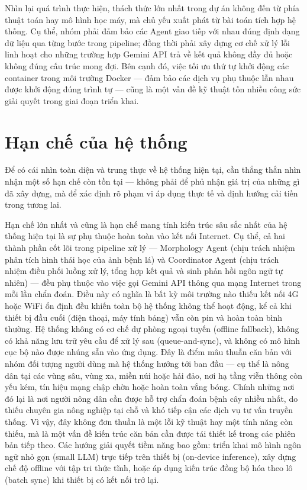 Nhìn lại quá trình thực hiện, thách thức lớn nhất trong dự án không đến từ phía thuật toán hay mô hình học máy, mà chủ yếu xuất phát từ bài toán tích hợp hệ thống. Cụ thể, nhóm phải đảm bảo các Agent giao tiếp với nhau đúng định dạng dữ liệu qua từng bước trong pipeline; đồng thời phải xây dựng cơ chế xử lý lỗi linh hoạt cho những trường hợp Gemini API trả về kết quả không đầy đủ hoặc không đúng cấu trúc mong đợi. Bên cạnh đó, việc tối ưu thứ tự khởi động các container trong môi trường Docker — đảm bảo các dịch vụ phụ thuộc lẫn nhau được khởi động đúng trình tự — cũng là một vấn đề kỹ thuật tốn nhiều công sức giải quyết trong giai đoạn triển khai.
\section{Hạn chế của hệ thống}

Để có cái nhìn toàn diện và trung thực về hệ thống hiện tại, cần thẳng thắn nhìn nhận một số hạn chế còn tồn tại — không phải để phủ nhận giá trị của những gì đã xây dựng, mà để xác định rõ phạm vi áp dụng thực tế và định hướng cải tiến trong tương lai.


Hạn chế lớn nhất và cũng là hạn chế mang tính kiến trúc sâu sắc nhất của hệ thống hiện tại là sự phụ thuộc hoàn toàn vào kết nối Internet. Cụ thể, cả hai thành phần cốt lõi trong pipeline xử lý — Morphology Agent (chịu trách nhiệm phân tích hình thái học của ảnh bệnh lá) và Coordinator Agent (chịu trách nhiệm điều phối luồng xử lý, tổng hợp kết quả và sinh phản hồi ngôn ngữ tự nhiên) — đều phụ thuộc vào việc gọi Gemini API thông qua mạng Internet trong mỗi lần chẩn đoán. Điều này có nghĩa là bất kỳ môi trường nào thiếu kết nối 4G hoặc WiFi ổn định đều khiến toàn bộ hệ thống không thể hoạt động, kể cả khi thiết bị đầu cuối (điện thoại, máy tính bảng) vẫn còn pin và hoàn toàn bình thường. Hệ thống không có cơ chế dự phòng ngoại tuyến (offline fallback), không có khả năng lưu trữ yêu cầu để xử lý sau (queue-and-sync), và không có mô hình cục bộ nào được nhúng sẵn vào ứng dụng. Đây là điểm mâu thuẫn căn bản với nhóm đối tượng người dùng mà hệ thống hướng tới ban đầu — cụ thể là nông dân tại các vùng sâu, vùng xa, miền núi hoặc hải đảo, nơi hạ tầng viễn thông còn yếu kém, tín hiệu mạng chập chờn hoặc hoàn toàn vắng bóng. Chính những nơi đó lại là nơi người nông dân cần được hỗ trợ chẩn đoán bệnh cây nhiều nhất, do thiếu chuyên gia nông nghiệp tại chỗ và khó tiếp cận các dịch vụ tư vấn truyền thống. Vì vậy, đây không đơn thuần là một lỗi kỹ thuật hay một tính năng còn thiếu, mà là một vấn đề kiến trúc căn bản cần được tái thiết kế trong các phiên bản tiếp theo. Các hướng giải quyết tiềm năng bao gồm: triển khai mô hình ngôn ngữ nhỏ gọn (small LLM) trực tiếp trên thiết bị (on-device inference), xây dựng chế độ offline với tập tri thức tĩnh, hoặc áp dụng kiến trúc đồng bộ hóa theo lô (batch sync) khi thiết bị có kết nối trở lại.


